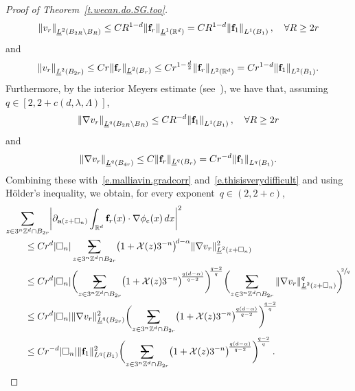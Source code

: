 \documentclass[11pt]{article} %
\makeatletter
\let\oldsquare\square %
\renewcommand{\square}{\oldsquare}
\numberwithin{equation}{section}
\theoremstyle{definition}
\let\originalleft\left
\let\originalright\right
\renewcommand{\left}{\mathopen{}\mathclose\bgroup\originalleft}
\renewcommand{\right}{\aftergroup\egroup\originalright}
\newcommand*{\Zd}{\ensuremath{\mathbb{Z}^d}}
\newcommand*{\Rd}{\ensuremath{\mathbb{R}^d}}
\newcommand{\f}{\mathbf{f}}
\renewcommand{\a}{\mathbf{a}}
\newcommand{\cu}{\square}
\newcommand{\X}{\mathcal{X}}
\newcommand{\avsum}{\mathop{\mathpalette\avsuminner\relax}\displaylimits}
\newcommand\avsuminner[2]{%
  {\sbox0{$\m@th#1\sum$}%
   \vphantom{\usebox0}%
   \ooalign{%
     \hidewidth
     \smash{\,\rule[.23em]{8.8pt}{1.1pt} \relax}%
     \hidewidth\cr
     $\m@th#1\sum$\cr
   }%
  }%
}
\makeatother
\begin{document}
\begin{proof}[{Proof of Theorem~\ref{t.wecan.do.SG.too}}]
\begin{equation*}
\left\| v_r \right\|_{\underline{L}^2(B_{2R}\setminus B_R )}
\leq 
CR^{1-d} \left\| \f_r \right\|_{\underline{L}^1(\Rd)} 
=
CR^{1-d} \left\| \f_1 \right\|_{L^1(B_1)} \,,
\quad \forall R\geq 2r
\end{equation*}
and
\begin{equation*}
\left\| v_r \right\|_{\underline{L}^2(B_{2r})}
\leq 
Cr  \| \f_r \|_{\underline{L}^2(B_r)}
\leq
Cr^{1-\frac d2}  \left\| \f_r \right\|_{L^2(\Rd)}
=
Cr^{1-d} \left\| \f_1 \right\|_{L^2(B_1)} .
\end{equation*}
Furthermore, by the interior Meyers estimate (see~\cite[Theorem C.1]{AKMBook}), we have that, assuming~$q \in [2, 2+c(d,\lambda,\Lambda)]$,  
\begin{equation}
\label{e.go.Meyersout}
\left\| \nabla v_r \right\|_{\underline{L}^q(B_{2R}\setminus B_R )}
\leq 
CR^{-d} \left\| \f_1 \right\|_{L^1(B_1)} \,,
\quad \forall R\geq 2r
\end{equation}
and
\begin{equation}
\label{e.go.Meyersin}
\left\| \nabla v_r \right\|_{\underline{L}^q(B_{4r})}
\leq 
C\| \f_r \|_{\underline{L}^q(B_r)}
=
C r^{-d} \left\| \f_1 \right\|_{L^q(B_1)} .
\end{equation}
Combining these with~\eqref{e.malliavin.gradcorr} and~\eqref{e.thisisverydifficult} and using H\"older's inequality, we obtain, for every exponent~$q\in (2,2+c)$, 
\begin{align*}
\lefteqn{ \sum_{z\in 3^n\Zd\cap B_{2r}} \left|  \partial_{\a(z+\cu_n)} \int_{\Rd} \f_r(x)\cdot \nabla \phi_e(x)\,dx
\right|^2
} \qquad & 
\notag \\ & 
\leq
C r^d |\cu_n| 
\avsum_{z\in 3^n\Zd\cap B_{2r}}
 \bigl(1+\X(z) 3^{-n} \bigr)^{\! d-\alpha}
\| \nabla v_r \|_{\underline{L}^2(z+\cu_n)}^2
\notag \\ & 
\leq 
Cr^d |\cu_n|
\biggl( \avsum_{z\in 3^n\Zd\cap B_{2r}}
 \bigl(1+\X(z) 3^{-n} \bigr)^{\! \frac{q(d-\alpha)}{q-2}}
\biggr)^{\!\!\frac{q-2}{q} }
\biggl( 
\avsum_{z\in 3^n\Zd\cap B_{2r}}
\| \nabla v_r \|_{\underline{L}^2(z+\cu_n)}^{q}
\biggr)^{\!\!\sfrac 2q}
\notag \\ & 
\leq 
Cr^d |\cu_n| 
\| \nabla v_r \|_{\underline{L}^q(B_{2r})}^2 
\biggl( \avsum_{z\in 3^n\Zd\cap B_{2r}}
 \bigl(1+\X(z) 3^{-n} \bigr)^{\! \frac{q(d-\alpha)}{q-2}}
\biggr)^{\!\!\frac{q-2}{q} }
\notag \\ & 
\leq 
C r^{-d} |\cu_n| \| \f_1\|_{L^q(B_1)}^2
\biggl( \avsum_{z\in 3^n\Zd\cap B_{2r}}
 \bigl(1+\X(z) 3^{-n} \bigr)^{\! \frac{q(d-\alpha)}{q-2}}
\biggr)^{\!\!\frac{q-2}{q} }
\,.
\end{align*}

\end{proof}
\end{document}
